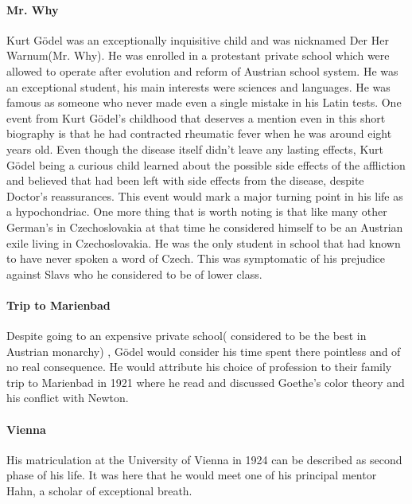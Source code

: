 \documentclass[12pt]{article}
\newcommand{\kg}{Kurt G{\"o}del }
\newcommand{\kgs}{Kurt G{\"o}del's }
\newcommand{\gd}{G{\"o}del }
\begin{document}
 \paragraph{Mr. Why}
 \kg was an exceptionally inquisitive child and was nicknamed Der Her Warnum(Mr. Why). He was enrolled in a protestant private school which were allowed to operate after evolution and reform of Austrian school system. He was an exceptional student, his main interests were sciences and languages. He was famous as someone who never made even a single mistake in his Latin tests.
 One event from \kgs childhood that deserves a mention even in this short biography is that he had contracted rheumatic fever when he was around eight years old. Even though the disease itself didn't leave any lasting effects, \kg being a curious child learned about the possible side effects of the affliction and believed that had been left with side effects from the disease, despite Doctor's reassurances. This event would mark a major turning point in his life as a hypochondriac.  
 One more thing that is worth noting is that like many other German's in Czechoslovakia  at that time he considered himself to be an Austrian exile living in Czechoslovakia. He was the only student in school that had known to have never spoken a word of Czech. This was symptomatic of his prejudice against Slavs who he considered to be of lower class.

 \paragraph{Trip to Marienbad} 
   Despite going to an expensive private school( considered to be the best in Austrian monarchy) , \gd would consider his time spent there pointless and of no real consequence. He would attribute his choice of profession to their family trip to Marienbad in 1921 where he read and discussed Goethe's color theory and his conflict with Newton.
 \paragraph{Vienna} 
   His matriculation at the University of Vienna in 1924 can be described as second phase of his life. It was here that he would meet one of his principal mentor Hahn, a scholar of exceptional breath.
\end{document}
